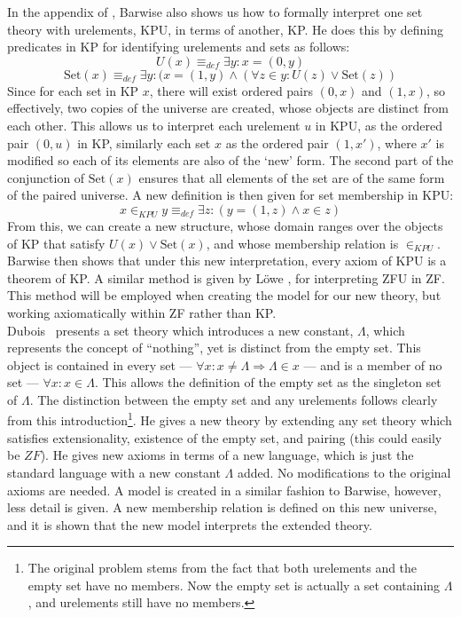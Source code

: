 \documentclass[11pt]{report}
\theoremstyle{definition}
\theoremstyle{theorem}
\theoremstyle{lemma}
\begin{document}
In the appendix of \cite{barwise}, Barwise also shows us how to formally interpret one set theory with urelements, KPU, in terms of another, KP.
He does this by defining predicates in KP for identifying urelements and sets as follows:
$$U(x) \equiv_{def} \exists y: x = (0,y)$$
$$\text{Set}(x) \equiv_{def} \exists y:(x = (1,y) \wedge (\forall z\in y: U(z) \vee \text{Set}(z))$$
Since for each set in KP $x$, there will exist ordered pairs $(0,x)$ and $(1,x)$, so effectively, two copies of the universe are created, whose objects are distinct from each other.
This allows us to interpret each urelement $u$ in KPU, as the ordered pair $(0,u)$ in KP, similarly each set $x$ as the ordered pair $(1,x')$, where $x'$ is modified so each of its elements are also of the `new' form.
The second part of the conjunction of $\text{Set}(x)$ ensures that all elements of the set are of the same form of the paired universe.
A new definition is then given for set membership in KPU:
$$x\in_{KPU} y \equiv_{def} \exists z: (y=(1,z) \wedge x\in z)$$
From this, we can create a new structure, whose domain ranges over the objects of KP that satisfy $U(x) \vee \text{Set}(x)$, and whose membership relation is $\in_{KPU}$.
Barwise then shows that under this new interpretation, every axiom of KPU is a theorem of KP.
A similar method is given by L\"owe \cite{lowe}, for interpreting ZFU in ZF.
This method will be employed when creating the model for our new theory, but working axiomatically within ZF rather than KP.\\

Dubois~\cite{dubois} presents a set theory which introduces a new constant, $\Lambda$, which represents the concept of ``nothing'', yet is distinct from the empty set.
This object is contained in every set --- $\forall x:x\neq\Lambda \Rightarrow \Lambda \in x$ --- and is a member of no set --- $\forall x: x\in \Lambda$.
This allows the definition of the empty set as the singleton set of $\Lambda$.
The distinction between the empty set and any urelements follows clearly from this introduction\footnote{The original problem stems from the fact that both urelements and the empty set have no members. Now the empty set is actually a set containing $\Lambda$, and urelements still have no members.}.
He gives a new theory by extending any set theory which satisfies extensionality, existence of the empty set, and pairing (this could easily be $\mathit{ZF}$).
He gives new axioms in terms of a new language, which is just the standard language with a new constant $\Lambda$ added. 
No modifications to the original axioms are needed.
A model is created in a similar fashion to Barwise, however, less detail is given.
A new membership relation is defined on this new universe, and it is shown that the new model interprets the extended theory.
\end{document}
